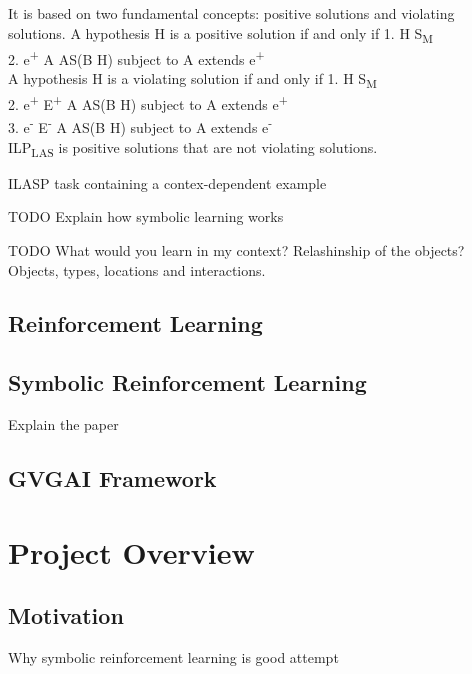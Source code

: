 \documentclass[12pt,twoside]{report}
\begin{document}
It is based on two fundamental concepts: positive solutions and violating solutions.
A hypothesis H is a positive solution if and only if
1. H \subseteq S\textsubscript{M} \\
2. \forall e\textsuperscript{+} \in \exists A \in AS(B \cup H) subject to A extends e\textsuperscript{+}\\

A hypothesis H is a violating solution if and only if
1. H \subseteq S\textsubscript{M} \\
2. \forall e\textsuperscript{+} \in E\textsuperscript{+} \exists A \in AS(B \cup H) subject to A extends e\textsuperscript{+}\\
3. \exists e\textsuperscript{-} \in E\textsuperscript{-} \exists A \in AS(B \cup H) subject to A extends e\textsuperscript{-}\\


ILP\textsubscript{LAS} is positive solutions that are not violating solutions. 

ILASP task containing a contex-dependent example

TODO Explain how symbolic learning works

TODO What would you learn in my context? Relashinship of the objects?
Objects, types, locations and interactions.

\section{Reinforcement Learning}



\section{Symbolic Reinforcement Learning}


Explain the paper
\section{GVGAI Framework}


\chapter{Project Overview}
\section{Motivation}

Why symbolic reinforcement learning is good attempt
\end{document}
